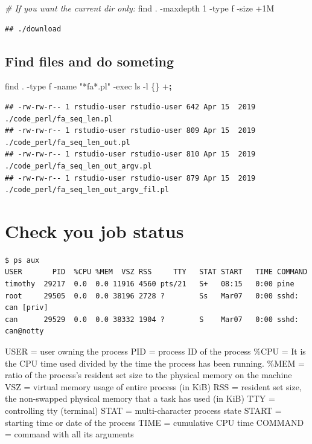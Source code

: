 \documentclass[]{book}
\makeatletter
\newenvironment{Shaded}{\begin{snugshade}}{\end{snugshade}}
\newcommand{\CommentTok}[1]{\textcolor[rgb]{0.56,0.35,0.01}{\textit{#1}}}
\newcommand{\DataTypeTok}[1]{\textcolor[rgb]{0.13,0.29,0.53}{#1}}
\newcommand{\FunctionTok}[1]{\textcolor[rgb]{0.00,0.00,0.00}{#1}}
\newcommand{\KeywordTok}[1]{\textcolor[rgb]{0.13,0.29,0.53}{\textbf{#1}}}
\newcommand{\NormalTok}[1]{#1}
\newcommand{\StringTok}[1]{\textcolor[rgb]{0.31,0.60,0.02}{#1}}
\newenvironment{kframe}{%
\medskip{}
\setlength{\fboxsep}{.8em}
 \def\at@end@of@kframe{}%
 \ifinner\ifhmode%
  \def\at@end@of@kframe{\end{minipage}}%
  \begin{minipage}{\columnwidth}%
 \fi\fi%
 \def\FrameCommand##1{\hskip\@totalleftmargin \hskip-\fboxsep
 \colorbox{shadecolor}{##1}\hskip-\fboxsep
     \hskip-\linewidth \hskip-\@totalleftmargin \hskip\columnwidth}%
 \MakeFramed {\advance\hsize-\width
   \@totalleftmargin\z@ \linewidth\hsize
   \@setminipage}}%
 {\par\unskip\endMakeFramed%
 \at@end@of@kframe}
\renewenvironment{Shaded}{\begin{kframe}}{\end{kframe}}
\makeatother
\begin{document}
\begin{Shaded}
\begin{Highlighting}[]
\CommentTok{# If you want the current dir only:}
\FunctionTok{find}\NormalTok{ . -maxdepth 1 -type f -size +1M}
\end{Highlighting}
\end{Shaded}

\begin{verbatim}
## ./download
\end{verbatim}

\hypertarget{find-files-and-do-someting}{%
\subsection{Find files and do someting}\label{find-files-and-do-someting}}

\begin{Shaded}
\begin{Highlighting}[]
\FunctionTok{find}\NormalTok{ . -type f -name }\StringTok{"*fa*.pl"}\NormalTok{ -exec ls -l }\DataTypeTok{\{\}}\NormalTok{ +}\KeywordTok{;} 
\end{Highlighting}
\end{Shaded}

\begin{verbatim}
## -rw-rw-r-- 1 rstudio-user rstudio-user 642 Apr 15  2019 ./code_perl/fa_seq_len.pl
## -rw-rw-r-- 1 rstudio-user rstudio-user 809 Apr 15  2019 ./code_perl/fa_seq_len_out.pl
## -rw-rw-r-- 1 rstudio-user rstudio-user 810 Apr 15  2019 ./code_perl/fa_seq_len_out_argv.pl
## -rw-rw-r-- 1 rstudio-user rstudio-user 879 Apr 15  2019 ./code_perl/fa_seq_len_out_argv_fil.pl
\end{verbatim}

\hypertarget{check-you-job-status}{%
\section{Check you job status}\label{check-you-job-status}}

\begin{verbatim}
$ ps aux  
USER       PID  %CPU %MEM  VSZ RSS     TTY   STAT START   TIME COMMAND
timothy  29217  0.0  0.0 11916 4560 pts/21   S+   08:15   0:00 pine  
root     29505  0.0  0.0 38196 2728 ?        Ss   Mar07   0:00 sshd: can [priv]   
can      29529  0.0  0.0 38332 1904 ?        S    Mar07   0:00 sshd: can@notty  
\end{verbatim}

USER = user owning the process
PID = process ID of the process
\%CPU = It is the CPU time used divided by the time the process has been running.
\%MEM = ratio of the process's resident set size to the physical memory on the machine
VSZ = virtual memory usage of entire process (in KiB)
RSS = resident set size, the non-swapped physical memory that a task has used (in KiB)
TTY = controlling tty (terminal)
STAT = multi-character process state
START = starting time or date of the process
TIME = cumulative CPU time
COMMAND = command with all its arguments
\end{document}

